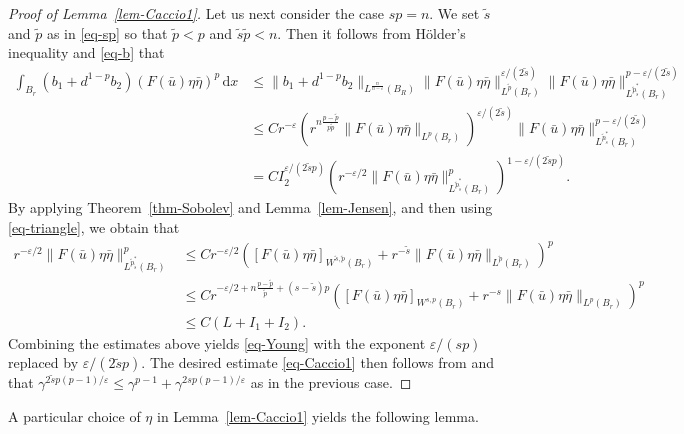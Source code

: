 \documentclass[11pt]{amsart}
\theoremstyle{plain}
\theoremstyle{definition}
\numberwithin{equation}{section}
\begin{document}
\begin{proof}[Proof of Lemma~\ref{lem-Caccio1}]
Let us next consider the case $sp=n$. We set $\tilde{s}$ and $\tilde{p}$ as in \eqref{eq-sp} so that $\tilde{p}<p$ and $\tilde{s}\tilde{p}<n$. Then it follows from H\"older's inequality and \eqref{eq-b} that
\begin{equation*}
\begin{split}
\int_{B_r} (b_1+d^{1-p}b_2) (F(\bar{u})\eta\bar{\eta})^p \,\mathrm{d}x
&\leq \|b_1+d^{1-p}b_2\|_{L^{\frac{n}{n-\varepsilon}}(B_R)} \|F(\bar{u})\eta\bar{\eta}\|_{L^{\tilde{p}}(B_r)}^{\varepsilon/(2\tilde{s})} \|F(\bar{u})\eta\bar{\eta}\|_{L^{\tilde{p}^{\ast}_{\tilde{s}}}(B_r)}^{p-\varepsilon/(2\tilde{s})} \\
&\leq C r^{-\varepsilon} \left( r^{n\frac{p-\tilde{p}}{p\tilde{p}}} \|F(\bar{u})\eta\bar{\eta}\|_{L^{p}(B_r)} \right)^{\varepsilon/(2\tilde{s})} \|F(\bar{u})\eta\bar{\eta}\|_{L^{\tilde{p}^{\ast}_{\tilde{s}}}(B_r)}^{p-\varepsilon/(2\tilde{s})} \\
&= C I_2^{\varepsilon/(2\tilde{s}p)} \left( r^{-\varepsilon/2} \|F(\bar{u})\eta\bar{\eta}\|_{L^{\tilde{p}^{\ast}_{\tilde{s}}}(B_r)}^p \right)^{1-\varepsilon/(2\tilde{s}p)}.
\end{split}
\end{equation*}
By applying Theorem~\ref{thm-Sobolev} and Lemma~\ref{lem-Jensen}, and then using \eqref{eq-triangle}, we obtain that
\begin{equation*}
\begin{split}
r^{-\varepsilon/2} \|F(\bar{u})\eta\bar{\eta}\|_{L^{\tilde{p}^{\ast}_{\tilde{s}}}(B_r)}^p
&\leq C r^{-\varepsilon/2} \left( [F(\bar{u})\eta\bar{\eta}]_{W^{\tilde{s}, \tilde{p}}(B_r)} + r^{-\tilde{s}}\|F(\bar{u})\eta\bar{\eta}\|_{L^{\tilde{p}}(B_r)} \right)^p \\
&\leq C r^{-\varepsilon/2 + n\frac{p-\tilde{p}}{\tilde{p}} + (s-\tilde{s})p} \left( [F(\bar{u})\eta\bar{\eta}]_{W^{s, p}(B_r)} + r^{-s} \|F(\bar{u})\eta\bar{\eta}\|_{L^p(B_r)} \right)^p \\
&\leq C (L + I_1 + I_2).
\end{split}
\end{equation*}
Combining the estimates above yields \eqref{eq-Young} with the exponent $\varepsilon/(sp)$ replaced by $\varepsilon/(2\tilde{s}p)$. The desired estimate \eqref{eq-Caccio1} then follows from \cite[Lemma~2]{Ser64} and that $\gamma^{2\tilde{s}p(p-1)/\varepsilon} \leq \gamma^{p-1}+\gamma^{2sp(p-1)/\varepsilon}$ as in the previous case.
\end{proof}

A particular choice of $\eta$ in Lemma~\ref{lem-Caccio1} yields the following lemma.
\end{document}
